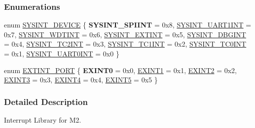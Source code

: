 \subsubsection*{Enumerations}
\begin{DoxyCompactItemize}
\item 
enum \mbox{\hyperlink{a00011_afa38f6b3d96898de1e521bf88e097a4c}{S\+Y\+S\+I\+N\+T\+\_\+\+D\+E\+V\+I\+CE}} \{ {\bfseries S\+Y\+S\+I\+N\+T\+\_\+\+S\+P\+I\+I\+NT} = 0x8, 
\mbox{\hyperlink{a00011_afa38f6b3d96898de1e521bf88e097a4ca0363b01262967c7900f56bf11fb3541d}{S\+Y\+S\+I\+N\+T\+\_\+\+U\+A\+R\+T1\+I\+NT}} = 0x7, 
\mbox{\hyperlink{a00011_afa38f6b3d96898de1e521bf88e097a4caa245202adffe4900175deab41b6518fc}{S\+Y\+S\+I\+N\+T\+\_\+\+W\+D\+T\+I\+NT}} = 0x6, 
\mbox{\hyperlink{a00011_afa38f6b3d96898de1e521bf88e097a4caf7b71238d06781c61f2d4894f74b12c3}{S\+Y\+S\+I\+N\+T\+\_\+\+E\+X\+T\+I\+NT}} = 0x5, 
\mbox{\hyperlink{a00011_afa38f6b3d96898de1e521bf88e097a4ca108e51031e1626a71e03626005ee11c2}{S\+Y\+S\+I\+N\+T\+\_\+\+D\+B\+G\+I\+NT}} = 0x4, 
\mbox{\hyperlink{a00011_afa38f6b3d96898de1e521bf88e097a4cace28a954633dd9ea0cdef0ad00fe87a2}{S\+Y\+S\+I\+N\+T\+\_\+\+T\+C2\+I\+NT}} = 0x3, 
\mbox{\hyperlink{a00011_afa38f6b3d96898de1e521bf88e097a4ca6a6e9a3e70344b1de433dcde4bfa569d}{S\+Y\+S\+I\+N\+T\+\_\+\+T\+C1\+I\+NT}} = 0x2, 
\mbox{\hyperlink{a00011_afa38f6b3d96898de1e521bf88e097a4ca046fae26abf2ef23f7ea24607cd837f5}{S\+Y\+S\+I\+N\+T\+\_\+\+T\+C0\+I\+NT}} = 0x1, 
\mbox{\hyperlink{a00011_afa38f6b3d96898de1e521bf88e097a4ca3fce9e90d8963a30d0fdb51cd9009db9}{S\+Y\+S\+I\+N\+T\+\_\+\+U\+A\+R\+T0\+I\+NT}} = 0x0
 \}
\item 
enum \mbox{\hyperlink{a00011_af11f5754cc92430795a63bb53d964cd4}{E\+X\+T\+I\+N\+T\+\_\+\+P\+O\+RT}} \{ {\bfseries E\+X\+I\+N\+T0} = 0x0, 
\mbox{\hyperlink{a00011_af11f5754cc92430795a63bb53d964cd4a6c87103fd7c63fc99ee4b631c0a4dac4}{E\+X\+I\+N\+T1}} = 0x1, 
\mbox{\hyperlink{a00011_af11f5754cc92430795a63bb53d964cd4a92c5398067978d1aefd4ba3c276dec32}{E\+X\+I\+N\+T2}} = 0x2, 
\mbox{\hyperlink{a00011_af11f5754cc92430795a63bb53d964cd4a3c37ddaa34bf4297b421d8577be06895}{E\+X\+I\+N\+T3}} = 0x3, 
\mbox{\hyperlink{a00011_af11f5754cc92430795a63bb53d964cd4a766aca243fc0f7aa292c791202bef6e7}{E\+X\+I\+N\+T4}} = 0x4, 
\mbox{\hyperlink{a00011_af11f5754cc92430795a63bb53d964cd4af59c814bf9818345f24bb79e7533945c}{E\+X\+I\+N\+T5}} = 0x5
 \}
\end{DoxyCompactItemize}


\subsubsection{Detailed Description}
Interrupt Library for M2. 

